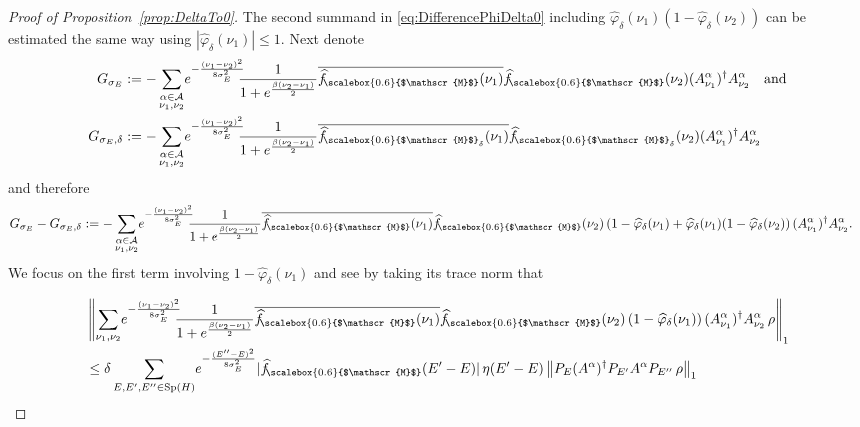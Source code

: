 \documentclass[11pt]{amsart}
\newcommand{\1}{\mathbbm{1}}
\newcommand{\spec}{\operatorname{Sp}}
\renewcommand{\phi}{\varphi}
\newcommand{\hatfM}{\widehat{f}_{\!\scalebox{0.6}{$\mathscr{M}$}}
}
\newcommand{\hatfMdelta}{\widehat{f}_{\!\scalebox{0.6}{$\mathscr{M}$}_\delta}}
\newcommand{\bin}[1]{}
\theoremstyle{plain}
\theoremstyle{definition}
\theoremstyle{remark}
\numberwithin{equation}{section}
\begin{document}
\begin{proof}[Proof of Proposition~\ref{prop:DeltaTo0}]
 \bin{Furthermore, for $H$ having simple spectrum, we could improve the above inequality by using $\|P_{E} \widetilde H^{\gamma}\rho \widetilde H^{\gamma}P_{E''}\|_1 = \|P_{E} \widetilde H^{\gamma}\rho \widetilde H^{\gamma}P_{E''}\|$ in this case which results in all trace norms involving $\rho$ being replaced by operator norms.}
The second summand in \eqref{eq:DifferencePhiDelta0} including $\widehat\phi_\delta(\nu_1)(1-\widehat\phi_\delta(\nu_2))$ can be estimated the same way using $|\widehat\phi_\delta(\nu_1)|\le 1.$ 
Next denote
\begin{align*}
   G_{\sigma_E}&:= -\sum_{\substack{\alpha\in\mathcal{A}\\ \nu_1,\nu_2}}\!e^{-\frac{(\nu_1-\nu_2)^2}{8\sigma_E^2}}\!\!\! \frac{1}{1+e^{\frac{\beta(\nu_2-\nu_1)}{2}}}\overline{\hatfM(\nu_1)}\hatfM(\nu_2)(A^\alpha_{\nu_1})^\dagger A^\alpha_{\nu_2}\quad\text{and}\\G_{\sigma_E,\delta}&:= -\sum_{\substack{\alpha\in\mathcal{A}\\ \nu_1,\nu_2}}\!e^{-\frac{(\nu_1-\nu_2)^2}{8\sigma_E^2}}\!\!\! \frac{1}{1+e^{\frac{\beta(\nu_2-\nu_1)}{2}}}\overline{\hatfMdelta(\nu_1)}\hatfMdelta(\nu_2)(A^\alpha_{\nu_1})^\dagger A^\alpha_{\nu_2}
\end{align*}
and therefore
\begin{align}
\label{eq:DifferenceGDelta0}
G_{\sigma_E}-G_{\sigma_E,\delta}&:= -\sum_{\substack{\alpha\in\mathcal{A}\\ \nu_1,\nu_2}}\!e^{-\frac{(\nu_1-\nu_2)^2}{8\sigma_E^2}}\!\!\! \frac{1}{1+e^{\frac{\beta(\nu_2-\nu_1)}{2}}}\overline{\hatfM(\nu_1)}\hatfM(\nu_2)\left(1-\widehat\phi_\delta(\nu_1) +\widehat\phi_\delta(\nu_1)(1-\widehat\phi_\delta(\nu_2)\right)(A^\alpha_{\nu_1})^\dagger A^\alpha_{\nu_2}.
\end{align}
We focus on the first term involving $1-\widehat\phi_\delta(\nu_1)$ and see by taking its trace norm that
\bin{\footnote{In the first inequality we use $e^{-\frac{(E''-E)^2}{8\sigma_E^2}}\le 1$ and $\frac{1}{1+e^{\frac{\beta(E''-E)}{2}}}\le 1.$ However, keeping these to regularise the sums over $E$ and $E''$ would lead to slightly weaker requirements on the energy of the input state. However, in the interest of an easier analysis we proceed as below.}}
\begin{align*}
&\left\|\sum_{\nu_1,\nu_2}\!e^{-\frac{(\nu_1-\nu_2)^2}{8\sigma_E^2}}\!\!\! \frac{1}{1+e^{\frac{\beta(\nu_2-\nu_1)}{2}}}\overline{\hatfM(\nu_1)}\hatfM(\nu_2)\left(1-\widehat\phi_\delta(\nu_1)\right)(A^\alpha_{\nu_1})^\dagger A^\alpha_{\nu_2}\,\rho\right\|_1\\&\le \delta\sum_{E,E',E''\in\spec(H)}\!e^{-\frac{(E''-E)^2}{8\sigma_E^2}}|\hatfM(E'-E)|\,\eta(E'-E)\left\|P_E(A^\alpha)^\dagger P_{E'}A^\alpha P_{E''}\,\rho\right\|_1 

\end{align*}
\end{proof}
\end{document}
